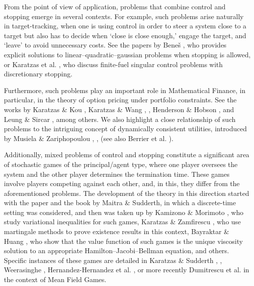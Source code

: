 \documentclass[11pt,tbtags,reqno]{article}
\theoremstyle{definition}
\numberwithin{equation}{section}
\theoremstyle{definition}
\begin{document}
From the point of view of application, problems that combine control and stopping emerge in several contexts. For example, such problems arise naturally in target-tracking, when one is using control in order to steer a system close to a target but also has to decide when ‘close is close enough,’ engage the target, and ‘leave’ to avoid unnecessary costs. See the papers by Beneš \cite{Benes92}, who provides explicit solutions to linear–quadratic–gaussian problems when stopping is allowed, or Karatzas et al. \cite{KarOcoWanZer}, who discuss finite-fuel singular control problems with discretionary stopping.

Furthermore, such problems play an important role in Mathematical Finance, in particular, in the theory of option pricing under portfolio constraints. See the works by Karatzas \& Kou \cite{KarKou98}, Karatzas \& Wang \cite{KarWang00}, \cite{KarWang01}, Henderson \& Hobson \cite{HenHob08}, and Leung \& Sircar \cite{LeuSir09}, among others. We also highlight a close relationship of such problems to the intriguing concept of dynamically consistent utilities, introduced by Musiela \& Zariphopoulou \cite{MusZar07}, \cite{MusZar09}, \cite{MusZar10} (see also Berrier et al. \cite{Ber09}).

Additionally, mixed problems of control and stopping constitute a significant area of stochastic games of the principal/agent type, where one player oversees the system and the other player determines the termination time. These games involve players competing against each other, and, in this, they differ from the aforementioned problems. The development of the theory in this direction started with the paper \cite{MaiSud96p} and the book \cite{MaiSud96b} by Maitra \& Sudderth, in which a discrete-time setting was considered, and then was taken up by Kamizono \& Morimoto \cite{KamMor02}, who study variational inequalities for such games, Karatzas \& Zamfirescu \cite{KarZamf08}, who use martingale methods to prove existence results in this context, Bayraktar \& Huang \cite{BayHua12}, who show that the value function of such games is the unique viscosity solution to an appropriate Hamilton–Jacobi–Bellman equation, and others. Specific instances of these games are detailed in Karatzas \& Sudderth \cite{KarSud06}, \cite{KarSud01}, Weerasinghe \cite{Weer06}, Hernandez-Hernandez et al. \cite{HerSimZer15}, or more recently Dumitrescu et al. \cite{DumLeuTan21} in the context of Mean Field Games.
\end{document}
